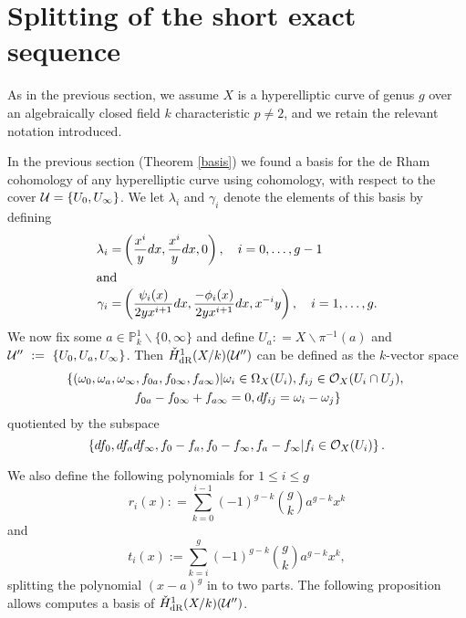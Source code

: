 
\section{Splitting of the short exact sequence}


As in the previous section, we assume $X$ is a hyperelliptic curve of genus $g$ over an algebraically closed field $k$ characteristic $p \neq 2$, and we retain the relevant notation introduced.

In the previous section (Theorem \ref{basis}) we found a basis for the de Rham cohomology of any hyperelliptic curve using \cech cohomology, with respect to the cover ${\mathcal U} = \{ U_0 , U_\infty\}$.
We let $\lambda_i$ and $\gamma_i$ denote the elements of this basis by defining
    \begin{align*}
    \lambda_i  = & \left( \frac{x^i}{y}dx, \frac{x^i}{y}dx, 0\right) ,\quad i=0, \ldots, g-1 \\
    \intertext{and}
    \gamma_i = & \left ( \frac{\psi_i(x)}{2yx^{i+1}}dx, \frac{-\phi_i(x)}{2yx^{i+1}}dx, x^{-i}y \right), \quad i=1,\ldots ,g.
    \end{align*}
We now fix some $a \in \mathbb P_k^1\backslash \{0, \infty\}$ and define $U_a : = X \backslash \pi^{-1}(a)$ and ${\mathcal U}''~:=~\{U_0,U_a, U_\infty\}$.
Then $\check{H}_{\text {dR}}^1(X/k)({\mathcal U}'')$ can be defined as the $k$-vector space 
    \begin{multline}\label{sixtupleconditions}
    \left\{ (\omega_0, \omega_a, \omega_\infty , f_{0a}, f_{0 \infty},f_{a \infty}) | \omega_i \in \Omega_X(U_i), f_{ij} \in {\cal O}_X(U_i \cap U_j), \right. \\ \left. f_{0a} - f_{0\infty} + f_{a \infty} = 0, df_{ij} = \omega_i - \omega_j \right\}
    \end{multline}
quotiented by the subspace 
    \[
    \left\{ df_0, df_a df_\infty, f_0- f_a, f_0 - f_\infty, f_a - f_\infty | f_i \in {\cal O}_X(U_i)\right\}.
    \]

We also define the following polynomials for $1 \leq i \leq g$
    \[
    r_i(x) : = \sum_{k=0}^{i-1} (-1)^{g-k}\binom{g}{k} a^{g-k} x^k
    \]
and
    \[
    t_i(x) := \sum_{k=i}^{g} (-1)^{g-k}\binom{g}{k} a^{g-k} x^k,
    \]
splitting the polynomial $(x-a)^g$ in to two parts.
The following proposition allows computes a basis of $\check{H}_{\text {dR}}^1(X/k)({\mathcal U}'')$.


